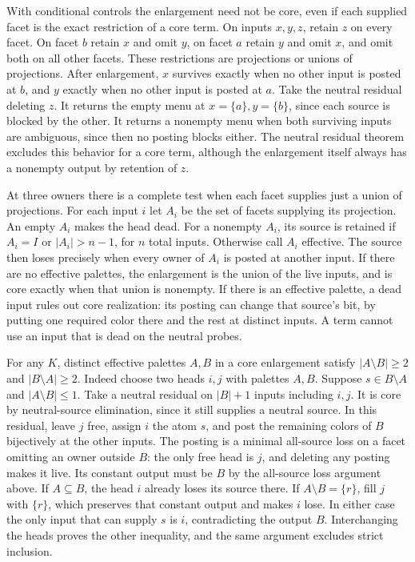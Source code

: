 With conditional controls the enlargement need not be core,
even if each supplied facet is the exact restriction of a
core term. On inputs $x,y,z$, retain $z$ on every facet.
On facet $b$ retain $x$ and omit $y$, on facet $a$ retain
$y$ and omit $x$, and omit both on all other facets.
These restrictions are projections or unions of projections.
After enlargement, $x$ survives exactly when no other input
is posted at $b$, and $y$ exactly when no other input is
posted at $a$. Take the neutral residual deleting $z$.
It returns the empty menu at $x=\{a\},y=\{b\}$, since
each source is blocked by the other. It returns a nonempty
menu when both surviving inputs are ambiguous, since then
no posting blocks either. The neutral residual theorem
excludes this behavior for a core term, although the
enlargement itself always has a nonempty output by retention
of $z$.

At three owners there is a complete test when each facet
supplies just a union of projections. For each input $i$
let $A_i$ be the set of facets supplying its projection.
An empty $A_i$ makes the head dead. For a nonempty $A_i$,
its source is retained if $A_i=I$ or $|A_i|>n-1$, for $n$
total inputs. Otherwise call $A_i$ effective. The source
then loses precisely when every owner of $A_i$ is posted
at another input. If there are no effective palettes, the
enlargement is the union of the live inputs, and is core
exactly when that union is nonempty. If there is an
effective palette, a dead input rules out core realization:
its posting can change that source's bit, by putting
one required color there and the rest at distinct inputs.
A term cannot use an input that is dead on the neutral probes.

For any $K$, distinct effective palettes $A,B$ in a core
enlargement satisfy $|A\setminus B|\ge2$ and
$|B\setminus A|\ge2$. Indeed choose two heads $i,j$ with
palettes $A,B$. Suppose $s\in B\setminus A$ and
$|A\setminus B|\le1$. Take a neutral residual on $|B|+1$
inputs including $i,j$. It is core by neutral-source
elimination, since it still supplies a neutral source.
In this residual, leave $j$ free, assign $i$ the atom $s$,
and post the remaining colors of $B$ bijectively at the
other inputs. The posting is a minimal all-source loss
on a facet omitting an owner outside $B$: the only free
head is $j$, and deleting any posting makes it live.
Its constant output must be $B$ by the all-source loss
argument above. If $A\subseteq B$, the head $i$ already
loses its source there. If $A\setminus B=\{r\}$, fill
$j$ with $\{r\}$, which preserves that constant output
and makes $i$ lose. In either case the only input that
can supply $s$ is $i$, contradicting the output $B$.
Interchanging the heads proves the other inequality,
and the same argument excludes strict inclusion.


